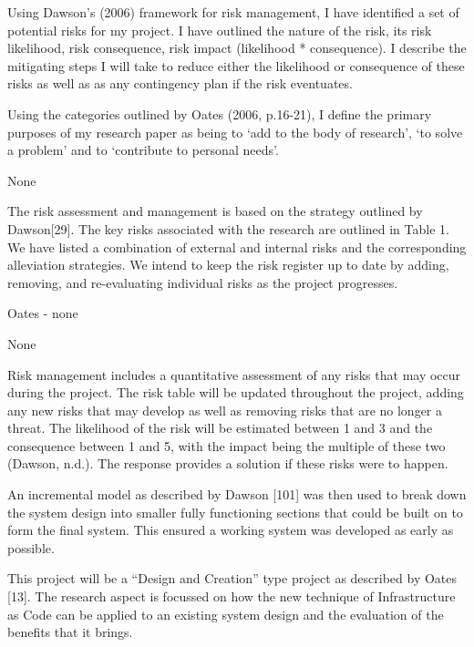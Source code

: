 

Using Dawson’s (2006) framework for risk management, I have identified a set of potential risks for my project. I have outlined the nature of the
risk, its risk likelihood, risk consequence, risk impact (likelihood * consequence). I describe the mitigating steps I will take to reduce either the
likelihood or consequence of these risks as well as as any contingency plan if the risk eventuates.

Using the categories outlined by Oates (2006, p.16-21), I define the primary purposes of my
research paper as being to ‘add to the body of research’, ‘to solve a problem’ and to
‘contribute to personal needs’.

None

The risk assessment and management is based on the strategy outlined by Dawson[29].
The key risks associated with the research are outlined in Table 1. We have listed a combination
of external and internal risks and the corresponding alleviation strategies.
We intend to keep the risk register up to date by adding, removing, and re-evaluating
individual risks as the project progresses.

Oates - none

None

Risk management includes a quantitative assessment of any risks that may occur during the
project. The risk table will be updated throughout the project, adding any new risks that may
develop as well as removing risks that are no longer a threat. The likelihood of the risk will be
estimated between 1 and 3 and the consequence between 1 and 5, with the impact being the
multiple of these two (Dawson, n.d.). The response provides a solution if these risks were to
happen.

An incremental model as described by Dawson [101] was then used to break down the system design
into smaller fully functioning sections that could be built on to form the final system. This ensured a
working system was developed as early as possible.

This project will be a “Design and Creation” type project as described by Oates [13]. The research
aspect is focussed on how the new technique of Infrastructure as Code can be applied to an existing
system design and the evaluation of the benefits that it brings.


